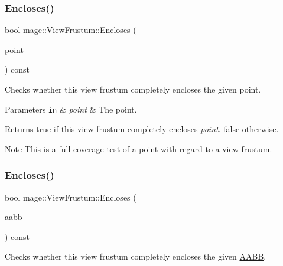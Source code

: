 \subsubsection{\texorpdfstring{Encloses()}{Encloses()}\hspace{0.1cm}{\footnotesize\ttfamily [2/4]}}
{\footnotesize\ttfamily bool mage\+::\+View\+Frustum\+::\+Encloses (\begin{DoxyParamCaption}\item[{F\+X\+M\+V\+E\+C\+T\+OR}]{point }\end{DoxyParamCaption}) const\hspace{0.3cm}{\ttfamily [noexcept]}}

Checks whether this view frustum completely encloses the given point.


\begin{DoxyParams}[1]{Parameters}
\mbox{\tt in}  & {\em point} & The point. \\
\hline
\end{DoxyParams}
\begin{DoxyReturn}{Returns}
{\ttfamily true} if this view frustum completely encloses {\itshape point}. {\ttfamily false} otherwise. 
\end{DoxyReturn}
\begin{DoxyNote}{Note}
This is a full coverage test of a point with regard to a view frustum. 
\end{DoxyNote}
\hypertarget{structmage_1_1_view_frustum_ad9bffbf0a041452888559db4a4ed5f48}{}\label{structmage_1_1_view_frustum_ad9bffbf0a041452888559db4a4ed5f48} 
\subsubsection{\texorpdfstring{Encloses()}{Encloses()}\hspace{0.1cm}{\footnotesize\ttfamily [3/4]}}
{\footnotesize\ttfamily bool mage\+::\+View\+Frustum\+::\+Encloses (\begin{DoxyParamCaption}\item[{const \hyperlink{structmage_1_1_a_a_b_b}{A\+A\+BB} \&}]{aabb }\end{DoxyParamCaption}) const\hspace{0.3cm}{\ttfamily [noexcept]}}

Checks whether this view frustum completely encloses the given \hyperlink{structmage_1_1_a_a_b_b}{A\+A\+BB}.


